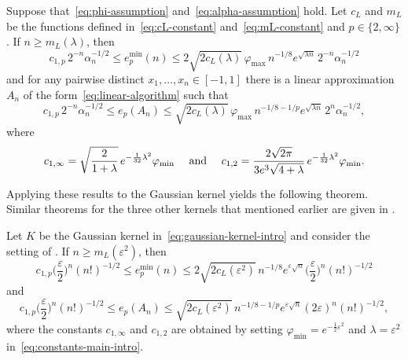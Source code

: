 \documentclass{mcom-l}
\numberwithin{equation}{section}
\numberwithin{theorem}{section} %
\begin{document}
\begin{theorem} \label{thm:main-intro}
  Suppose that~\eqref{eq:phi-assumption} and~\eqref{eq:alpha-assumption} hold.
  Let $c_L$ and $m_L$ be the functions defined in~\eqref{eq:cL-constant} and~\eqref{eq:mL-constant} and $p \in \{2, \infty\}$.
  If $n \geq m_L(\lambda)$, then
\begin{equation*}
  c_{1,p} \, 2^{-n} \alpha_n^{-1/2} \leq e_p^{\min}(n) \leq 2 \sqrt{2 c_L(\lambda)} \, \varphi_{\max} \, n^{-1/8} e^{\sqrt{\lambda n}} \,  2^{-n}  \alpha_n^{-1/2}
\end{equation*}
and for any pairwise distinct $x_1, \ldots, x_n \in [-1, 1]$ there is a linear approximation $A_n$ of the form~\eqref{eq:linear-algorithm} such that
  \begin{equation*}
    c_{1,p} \, 2^{-n} \alpha_n^{-1/2} \leq e_p(A_n) \leq \sqrt{2 c_L(\lambda)} \, \varphi_{\max} \, n^{-1/8 - 1/p} e^{\sqrt{\lambda n}} \, 2^{n} \alpha_n^{-1/2},
  \end{equation*}
  where
  \begin{equation} \label{eq:constants-main-intro}
    c_{1,\infty} = \sqrt{ \frac{2}{1 + \lambda}} \, e^{-\frac{1}{32}\lambda^2} \varphi_\textup{min} \quad \text{ and } \quad c_{1, 2} = \frac{2\sqrt{2\pi}}{3e^3 \sqrt{\smash[b]{4 + \lambda}}} \, e^{-\frac{1}{32}\lambda^2} \varphi_\textup{min}.
  \end{equation}
\end{theorem}

Applying these results to the Gaussian kernel yields the following theorem.
Similar theorems for the three other kernels that mentioned earlier are given in .

\begin{theorem} \label{thm:gauss-intro}
  Let $K$ be the Gaussian kernel in~\eqref{eq:gaussian-kernel-intro} and consider the setting of .
  If $n \geq m_L(\varepsilon^2)$, then
\begin{equation} \label{eq:gauss-min-intro}
  c_{1,p} \bigg( \frac{\varepsilon}{2} \bigg)^n (n!)^{-1/2} \leq e_p^{\min}(n) \leq 2 \sqrt{2 c_L(\varepsilon^2)}  \, n^{-1/8} e^{\varepsilon\sqrt{n}} \bigg( \frac{\varepsilon}{2} \bigg)^n (n!)^{-1/2}
\end{equation}
and
\begin{equation} \label{eq:gauss-any-intro}
  c_{1,p} \bigg( \frac{\varepsilon}{2} \bigg)^n (n!)^{-1/2} \leq e_p(A_n) \leq \sqrt{2 c_L(\varepsilon^2)} \, n^{-1/8 - 1/p} e^{\varepsilon\sqrt{n}} (2\varepsilon)^n (n!)^{-1/2},
\end{equation}
where the constants $c_{1, \infty}$ and $c_{1,2}$ are obtained by setting $\varphi_{\min} = e^{-\frac{1}{2} \varepsilon^2}$ and $\lambda = \varepsilon^2$ in~\eqref{eq:constants-main-intro}.
\end{theorem}
\end{document}
